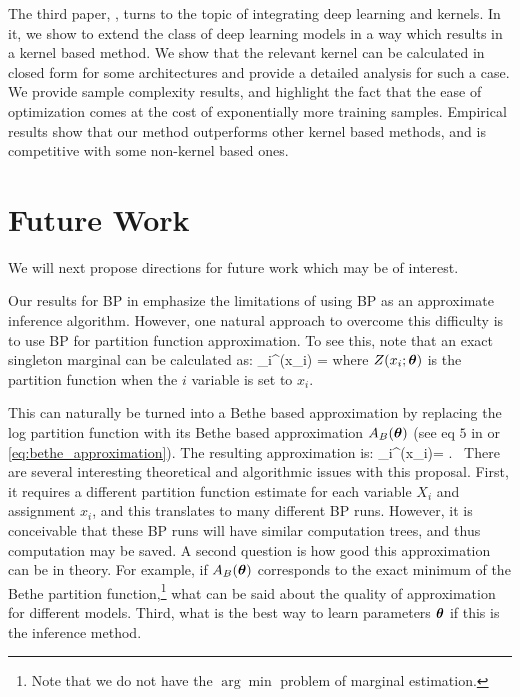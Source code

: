 The third paper, , turns to the topic of integrating deep learning and kernels.
In it, we show to extend the class of deep learning models in a way which results in a kernel based method.
We show that the relevant kernel can be calculated in closed form for some architectures and provide a detailed analysis for such a case.
We provide sample complexity results, and highlight the fact that the ease of optimization comes at the cost of exponentially more training samples.
Empirical results show that our method outperforms other kernel based methods, and is competitive with some non-kernel based ones.  


\section{Future Work}
We will next propose directions for future work which may be of interest.

Our results for BP in  emphasize the limitations of using BP as an approximate inference algorithm. However, one natural approach to overcome this difficulty is to use BP for partition function approximation. To see this, note that an exact singleton marginal can be calculated as:
\be
\mu_i^{\thetav}(x_i) = 
\label{eq:marg_partition}
\ee
where $Z(x_i;\boldsymbol{\theta})$ 
is the partition function when the $i$ variable is set to $x_i$.  

This can naturally be turned into a Bethe based approximation by replacing the log partition function with its Bethe based approximation $A_B(\boldsymbol{\theta})$ (see eq $5$ in  or \eqref{eq:bethe_approximation}). The resulting approximation is:
\be
\tau_i^{\thetav}(x_i)=  .~
\ee
There are several interesting theoretical and algorithmic issues with this proposal. First, it requires a different partition function estimate for each variable $X_i$ and assignment $x_i$, and this translates to many different BP runs. However, it is conceivable that these BP runs will have similar computation trees, and thus computation may be saved. A second question is how good this approximation can be in theory. For example, if $A_B(\boldsymbol{\theta})$ corresponds to the exact minimum of the Bethe partition function,\footnote{Note that we do not have the $\arg\min$ problem of marginal estimation.} what can be said about the quality of approximation for different models. Third, what is the best way to learn parameters $\boldsymbol{\theta}$ if this is the inference method.

